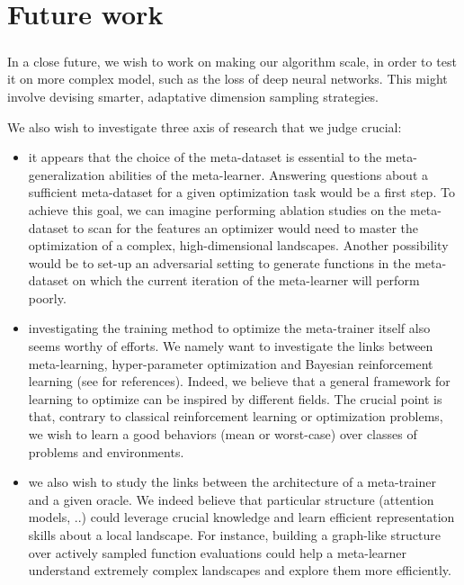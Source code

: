 	\chapter{Future work}
	{
		\label{chap::future}
		
		\paragraph{} In a close future, we wish to work on making our algorithm scale, in order to test it on more complex model, such as the loss of deep neural networks. This might involve devising smarter, adaptative dimension sampling strategies. 
		
		We also wish to investigate three axis of research that we judge crucial: 
		\begin{itemize}
			\item it appears that the choice of the meta-dataset is essential to the meta-generalization abilities of the meta-learner. Answering questions about a sufficient meta-dataset for a given optimization task would be a first step. To achieve this goal, we can imagine performing ablation studies on the meta-dataset to scan for the features an optimizer would need to master the optimization of a complex, high-dimensional landscapes. Another possibility would be to set-up an adversarial setting to generate functions in the meta-dataset on which the current iteration of the meta-learner will perform poorly. 
			
			\item investigating the training method to optimize the meta-trainer itself also seems worthy of efforts. We namely want to investigate the links between meta-learning, hyper-parameter optimization and Bayesian reinforcement learning (see \cite{ghavamzadeh2015bayesian} for references). Indeed, we believe that a general framework for learning to optimize can be inspired by different fields. The crucial point is that, contrary to classical reinforcement learning or optimization problems, we wish to learn a good behaviors (mean or worst-case) over classes of problems and environments. 
			
			\item we also wish to study the links between the architecture of a meta-trainer and a given oracle. We indeed believe that particular structure (attention models, ..) could leverage crucial knowledge and learn efficient representation skills about a local landscape. For instance, building a graph-like structure over actively sampled function evaluations could help a meta-learner understand extremely complex landscapes and explore them more efficiently. 
		\end{itemize}

		
	}